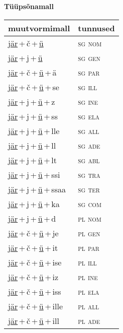 
\vspace{1.8em}
\begin{minipage}{\textwidth}
\textbf{Tüüpsõnamall \,}\\

\begin{sideways}
\begin{tabular}{l l}
muutvormimall & tunnused \\
\hline
\underline{jär}\,+\,č\,+\,\underline{ü} & \textsc{ sg nom } \\
\underline{jär}\,+\,j\,+\,\underline{ü} & \textsc{ sg gen } \\
\underline{jär}\,+\,č\,+\,\underline{ü}\,+\,ä & \textsc{ sg par } \\
\underline{jär}\,+\,č\,+\,\underline{ü}\,+\,se & \textsc{ sg ill } \\
\underline{jär}\,+\,j\,+\,\underline{ü}\,+\,z & \textsc{ sg ine } \\
\underline{jär}\,+\,j\,+\,\underline{ü}\,+\,ss & \textsc{ sg ela } \\
\underline{jär}\,+\,j\,+\,\underline{ü}\,+\,lle & \textsc{ sg all } \\
\underline{jär}\,+\,j\,+\,\underline{ü}\,+\,ll & \textsc{ sg ade } \\
\underline{jär}\,+\,j\,+\,\underline{ü}\,+\,lt & \textsc{ sg abl } \\
\underline{jär}\,+\,j\,+\,\underline{ü}\,+\,ssi & \textsc{ sg tra } \\
\underline{jär}\,+\,j\,+\,\underline{ü}\,+\,ssaa & \textsc{ sg ter } \\
\underline{jär}\,+\,j\,+\,\underline{ü}\,+\,ka & \textsc{ sg com } \\
\underline{jär}\,+\,j\,+\,\underline{ü}\,+\,d & \textsc{ pl nom } \\
\underline{jär}\,+\,č\,+\,\underline{ü}\,+\,je & \textsc{ pl gen } \\
\underline{jär}\,+\,č\,+\,\underline{ü}\,+\,it & \textsc{ pl par } \\
\underline{jär}\,+\,č\,+\,\underline{ü}\,+\,ise & \textsc{ pl ill } \\
\underline{jär}\,+\,č\,+\,\underline{ü}\,+\,iz & \textsc{ pl ine } \\
\underline{jär}\,+\,č\,+\,\underline{ü}\,+\,iss & \textsc{ pl ela } \\
\underline{jär}\,+\,č\,+\,\underline{ü}\,+\,ille & \textsc{ pl all } \\
\underline{jär}\,+\,č\,+\,\underline{ü}\,+\,ill & \textsc{ pl ade } \\

\end{tabular}
\end{sideways}
\end{minipage}
